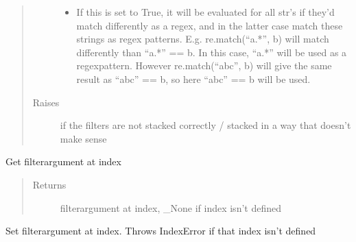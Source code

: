 \documentclass[a4paper,10pt,english]{sphinxmanual}
\begin{document}
\begin{fulllineitems}
\begin{fulllineitems}
\begin{quote}
\begin{description}
\begin{itemize}
\item {}
\sphinxAtStartPar
{} \textendash{} If this is set to True, it will be evaluated for all str’s if they’d match differently as a
regex, and in the latter case match these strings as regex patterns. E.g. re.match(“a.*”, b) will match
differently than “a.*” == b. In this case, “a.*” will be used as a regex\sphinxhyphen{}pattern. However
re.match(“abc”, b) will give the same result as “abc” == b, so here “abc” == b will be used.

\end{itemize}

\item[{Raises}] \leavevmode
\sphinxAtStartPar
{} \textendash{} if the filters are not stacked correctly / stacked in a way that doesn’t make sense

\end{description}\end{quote}

\end{fulllineitems}


\begin{fulllineitems}
\label{\detokenize{fagus.filters:fagus.filters.KFil.__getitem__}}
\pysigstartsignatures
{}
\pysigstopsignatures
\sphinxAtStartPar
Get filter\sphinxhyphen{}argument at index
\begin{quote}\begin{description}
\item[{Returns}] \leavevmode
\sphinxAtStartPar
filter\sphinxhyphen{}argument at index, \_None if index isn’t defined

\end{description}\end{quote}

\end{fulllineitems}


\begin{fulllineitems}
\label{\detokenize{fagus.filters:fagus.filters.KFil.__setitem__}}
\pysigstartsignatures
{}
\pysigstopsignatures
\sphinxAtStartPar
Set filter\sphinxhyphen{}argument at index. Throws IndexError if that index isn’t defined


\end{fulllineitems}
\end{fulllineitems}
\end{document}
